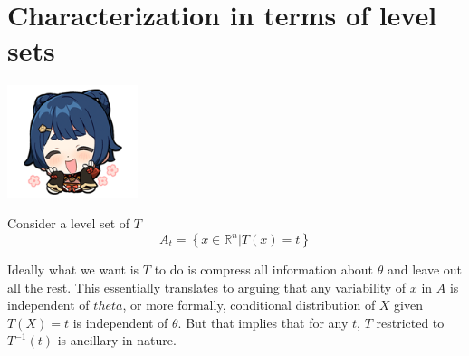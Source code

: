 \documentclass[oneside]{book}
\begin{document}
\section{Characterization in terms of level sets}
\begin{marginfigure}%
    \includegraphics[width=1.5in]{chibis/file_016.png}
\end{marginfigure}%
Consider a level set of $T$
$$A_t=\left\{x\in\mathbb R^n|T(x)=t \right\}$$

Ideally what we want is $T$ to do is compress all information about $\theta$ and leave out all the rest. This essentially translates to arguing that any variability of $x$ in $A$ is independent of $theta$, or more formally,  conditional distribution of $X$ given $T(X)=t$ is independent of $\theta$. But that implies that for any $t$, $T$ restricted to $T^{-1}(t)$ is ancillary in nature.
\end{document}

